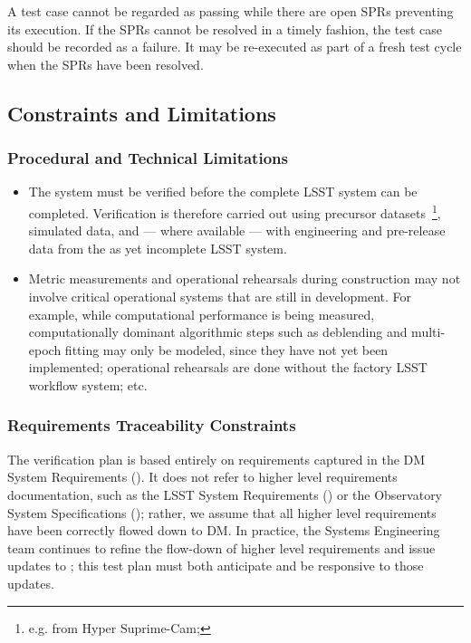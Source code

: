 A test case cannot be regarded as passing while there are open SPRs preventing its execution.
If the SPRs cannot be resolved in a timely fashion, the test case should be recorded as a failure.
It may be re-executed as part of a fresh test cycle when the SPRs have been resolved.

\subsection{Constraints and Limitations}

\subsubsection{Procedural and Technical Limitations}

\begin{itemize}


  \item{The \product{} system must be verified before the complete LSST system can be completed. Verification is therefore carried out using precursor datasets~\footnote{e.g. from Hyper Suprime-Cam; }, simulated data, and --- where available --- with engineering and pre-release data from the as yet incomplete LSST system.}

  \item{Metric measurements and operational rehearsals during construction may not involve critical operational systems that are still in development. For example, while computational performance is being measured, computationally dominant algorithmic steps such as deblending and multi-epoch fitting may only be modeled, since they have not yet been implemented; operational rehearsals are done without the factory LSST workflow system; etc.}

\end{itemize}

\subsubsection{Requirements Traceability Constraints}

The \product{} verification plan is based entirely on requirements captured in the DM System Requirements ().
It does not refer to higher level requirements documentation, such as the LSST System Requirements () or the Observatory System Specifications (); rather, we assume that all higher level requirements have been correctly flowed down to DM.
In practice, the Systems Engineering team continues to refine the flow-down of higher level requirements and issue updates to ; this test plan must both anticipate and be responsive to those updates.
